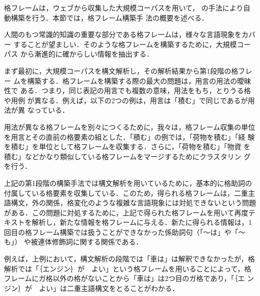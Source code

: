 \documentclass[japanese]{jnlp_1.3e}
\begin{document}
格フレームは，ウェブから収集した大規模コーパスを用いて，
\cite{Kawahara2006}の手法により自動構築を行う．本節では，格フレーム構築手
法の概要を述べる．

人間のもつ常識的知識の重要な部分である格フレームは，様々な言語現象をカバー
することが望ましい．そのような格フレームを構築するために，大規模コーパス
から漸進的に確からしい情報を抽出する．

\begin{table}[b]

\end{table}

まず最初に，大規模コーパスを構文解析し，その解析結果から第1段階の格フレー
ムを構築する．格フレームを構築する際の最大の問題は，用言の用法の曖昧性で
ある．つまり，同じ表記の用言でも複数の意味，用法をもち，とりうる格や用例
が異なる．例えば，以下の2つの例は，用言は「積む」で同じであるが用法が異
なっている．

\begin{lingexample}
\end{lingexample}

\noindent
用法が異なる格フレームを別々につくるために，我々は，格フレーム収集の単位
を用言とその直前の格要素の組とした．「積む」の例では，「荷物を積む」「経
験を積む」を単位として格フレームを収集する．さらに，「荷物を積む」「物資
を積む」などかなり類似している格フレームをマージするためにクラスタリン
グを行う．

上記の第1段階の構築手法では構文解析を用いているために，基本的に格助詞の
付属している格要素を収集している．このため，得られる格フレームは，二重主
語構文，外の関係，格変化のような複雑な言語現象には対処できないという問題
がある．この問題に対処するために，上記で得られた格フレームを用いて再度テ
キストを解析し，新たな情報を格フレームに与える．新たに得られる情報は，1
回目の格フレーム構築では扱うことができなかった係助詞句（「〜は」や「〜も」）
や被連体修飾詞に関する関係である．

\begin{lingexample}
\end{lingexample}

例えば，上例において，構文解析の段階では「車は」は解釈できなかったが，格
解析では「｛エンジン｝が　よい」という格フレームを用いることによって，格
フレームにガ格以外の格がないことから「車は」は2つ目のガ格であり，「｛エ
ンジン｝が　よい」は二重主語構文をとることがわかる．

\begin{lingexample}
\end{lingexample}
\end{document}
